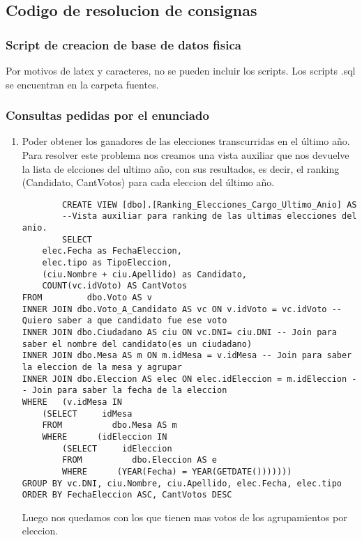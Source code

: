 \subsection{Codigo de resolucion de consignas}
\subsubsection{Script de creacion de base de datos fisica}
Por motivos de latex y caracteres, no se pueden incluir los scripts. Los scripts .sql se encuentran en la carpeta fuentes.

\subsubsection{Consultas pedidas por el enunciado}
\begin{enumerate}
	\item Poder obtener los ganadores de las elecciones transcurridas en el último año.
		Para resolver este problema nos creamos una vista auxiliar que nos devuelve la lista de elcciones del ultimo a\~no, 
		con sus resultados, es decir, el ranking (Candidato, CantVotos) para cada eleccion del último año.

		\begin{lstlisting}
		CREATE VIEW [dbo].[Ranking_Elecciones_Cargo_Ultimo_Anio] AS
		--Vista auxiliar para ranking de las ultimas elecciones del anio.
		SELECT 
	elec.Fecha as FechaEleccion, 
	elec.tipo as TipoEleccion,
	(ciu.Nombre + ciu.Apellido) as Candidato, 
	COUNT(vc.idVoto) AS CantVotos
FROM         dbo.Voto AS v 
INNER JOIN dbo.Voto_A_Candidato AS vc ON v.idVoto = vc.idVoto -- Quiero saber a que candidato fue ese voto
INNER JOIN dbo.Ciudadano AS ciu ON vc.DNI= ciu.DNI -- Join para saber el nombre del candidato(es un ciudadano)
INNER JOIN dbo.Mesa AS m ON m.idMesa = v.idMesa -- Join para saber la eleccion de la mesa y agrupar
INNER JOIN dbo.Eleccion AS elec ON elec.idEleccion = m.idEleccion -- Join para saber la fecha de la eleccion
WHERE	(v.idMesa IN
	(SELECT     idMesa
	FROM          dbo.Mesa AS m
	WHERE      (idEleccion IN
		(SELECT     idEleccion
		FROM          dbo.Eleccion AS e
		WHERE      (YEAR(Fecha) = YEAR(GETDATE()))))))
GROUP BY vc.DNI, ciu.Nombre, ciu.Apellido, elec.Fecha, elec.tipo
ORDER BY FechaEleccion ASC, CantVotos DESC

\end{lstlisting}
		
Luego nos quedamos con los que tienen mas votos de los agrupamientos por eleccion.


\end{enumerate}
